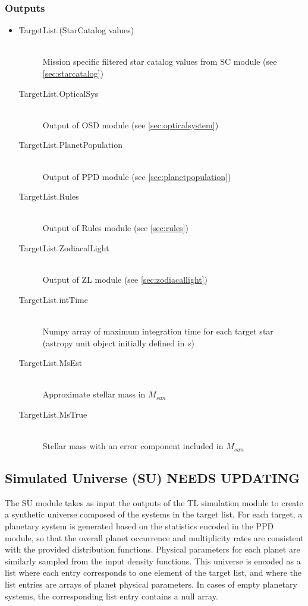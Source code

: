 \documentclass[cleanfoot]{asme2ej}
\begin{document}
\subsubsection*{Outputs}
\begin{itemize}
    \item 
    \begin{description}
        \item[TargetList.(StarCatalog values)] \hfill \\
        Mission specific filtered star catalog values from SC module (see \ref{sec:starcatalog})
        \item[TargetList.OpticalSys] \hfill \\
        Output of OSD module (see \ref{sec:opticalsystem})
        \item[TargetList.PlanetPopulation] \hfill \\
        Output of PPD module (see \ref{sec:planetpopulation})
        \item[TargetList.Rules] \hfill \\
        Output of Rules module (see \ref{sec:rules})
        \item[TargetList.ZodiacalLight] \hfill \\
        Output of ZL module (see \ref{sec:zodiacallight})
        \item[TargetList.intTime] \hfill \\
        Numpy array of maximum integration time for each target star (astropy unit object initially defined in $ s $)
        \item[TargetList.MsEst] \hfill \\
        Approximate stellar mass in $ M_{sun} $
        \item[TargetList.MsTrue] \hfill \\
        Stellar mass with an error component included in $ M_{sun} $
    \end{description}
\end{itemize}


\subsection{Simulated Universe (SU) NEEDS UPDATING}
The SU module takes as input the outputs of the TL simulation module to create a synthetic universe composed of the systems in the target list.  For each target, a planetary system is generated based on the statistics encoded in the PPD module, so that the overall planet occurrence and multiplicity rates are consistent with the provided distribution functions.  Physical parameters for each planet are similarly sampled from the input density functions.  This universe is encoded as a list where each entry corresponds to one element of the target list, and where the list entries are arrays of planet physical parameters.  In cases of empty planetary systems, the corresponding list entry contains a null array.
\end{document}
